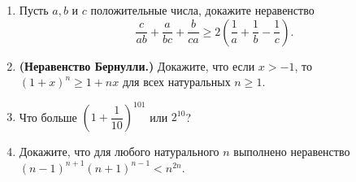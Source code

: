 \documentclass{article}
\begin{document}
\begin{enumerate}[label*=\protect\fbox{\arabic{enumi}}]
\item Пусть $a, b$ и $c$ положительные числа, докажите неравенство 
$$\frac{c}{a b}+\frac{a}{b c}+\frac{b}{c a} \geqslant 2\left(\frac{1}{a}+\frac{1}{b}-\frac{1}{c}\right).$$

\item \textbf{(Неравенство Бернулли.)} Докажите, что если $x>-1$, то $(1+x)^n\geqslant 1 + nx$ для всех натуральных $n\geqslant 1.$

\item Что больше $\left(1+\dfrac{1}{10}\right)^{101}$ или $2^{10}$?

\item Докажите, что для любого натурального $n$ выполнено неравенство  \\$(n - 1)^{n+1}(n + 1)^{n-1}< n^{2n}$.

\end{enumerate}
\end{document}
